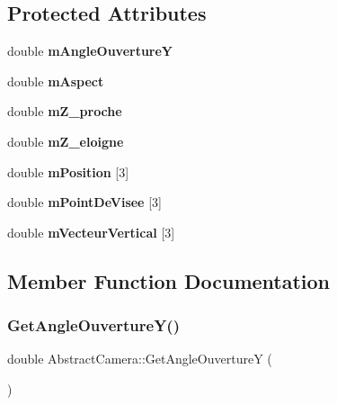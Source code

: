 \subsection*{Protected Attributes}
\begin{DoxyCompactItemize}
\item 
\mbox{\label{classAbstractCamera_a2352ec0e1fdb0ab22345263c49f3ed3a}} 
double {\bfseries m\+Angle\+OuvertureY}
\item 
\mbox{\label{classAbstractCamera_a84ea352c679449eeef49d92274bfc9e0}} 
double {\bfseries m\+Aspect}
\item 
\mbox{\label{classAbstractCamera_a408e219c2aed42b6aa4f9198c252d10a}} 
double {\bfseries m\+Z\+\_\+proche}
\item 
\mbox{\label{classAbstractCamera_a8e076553a55c8e2f19948bdf4ea01be1}} 
double {\bfseries m\+Z\+\_\+eloigne}
\item 
\mbox{\label{classAbstractCamera_aacd5e7f2d881e719f254a1d6e2904b91}} 
double {\bfseries m\+Position} \mbox{[}3\mbox{]}
\item 
\mbox{\label{classAbstractCamera_af09c5a5da7cc666845003abfd91e2b46}} 
double {\bfseries m\+Point\+De\+Visee} \mbox{[}3\mbox{]}
\item 
\mbox{\label{classAbstractCamera_a04f9fd97a52940ec990af6fece9aeeb0}} 
double {\bfseries m\+Vecteur\+Vertical} \mbox{[}3\mbox{]}
\end{DoxyCompactItemize}


\subsection{Member Function Documentation}
\mbox{\label{classAbstractCamera_abdff3ca2922e09f59d3f1c026d78420d}} 
\subsubsection{\texorpdfstring{GetAngleOuvertureY()}{GetAngleOuvertureY()}}
{\footnotesize\ttfamily double Abstract\+Camera\+::\+Get\+Angle\+OuvertureY (\begin{DoxyParamCaption}{ }\end{DoxyParamCaption})}

